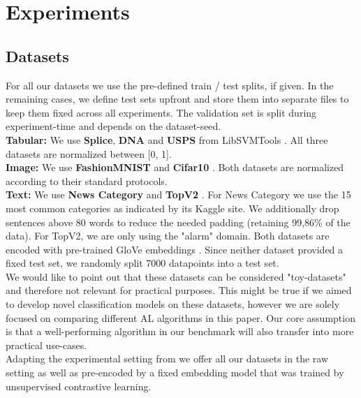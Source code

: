 \documentclass[]{article}
\begin{document}
\section{Experiments}

\subsection{Datasets}\label{sec:datasets}
For all our datasets we use the pre-defined train / test splits, if given. 
In the remaining cases, we define test sets upfront and store them into separate files to keep them fixed across all experiments.
The validation set is split during experiment-time and depends on the dataset-seed.\\
\textbf{Tabular:}
We use \textbf{Splice}, \textbf{DNA} and \textbf{USPS} from LibSVMTools \cite{libsvmtools}.
All three datasets are normalized between [0, 1]. \\
\textbf{Image:}
We use \textbf{FashionMNIST} \cite{xiao2017fashion} and \textbf{Cifar10} \cite{krizhevsky2009learning}.
Both datasets are normalized according to their standard protocols. \\
\textbf{Text:}
We use \textbf{News Category} \cite{misra2022news} and \textbf{TopV2} \cite{chen-etal-2020-low-resource}.
For News Category we use  the 15 most common categories as indicated by its Kaggle site.
We additionally drop sentences above 80 words to reduce the needed padding (retaining 99,86\% of the data).
For TopV2, we are only using the "alarm" domain.
Both datasets are encoded with pre-trained GloVe embeddings \cite{pennington2014glove}.
Since neither dataset provided a fixed test set, we randomly split 7000 datapoints into a test set. \\ [1mm]
%
We would like to point out that these datasets can be considered "toy-datasets" and therefore not relevant for practical purposes.
This might be true if we aimed to develop novel classification models on these datasets, however we are solely focused on comparing different AL algorithms in this paper.
Our core assumption is that a well-performing algorithm in our benchmark will also transfer into more practical use-cases. \\ [1mm]
Adapting the experimental setting from \cite{hacohen2022active} we offer all our datasets in the raw setting as well as pre-encoded by a fixed embedding model that was trained by unsupervised contrastive learning. 
\end{document}
